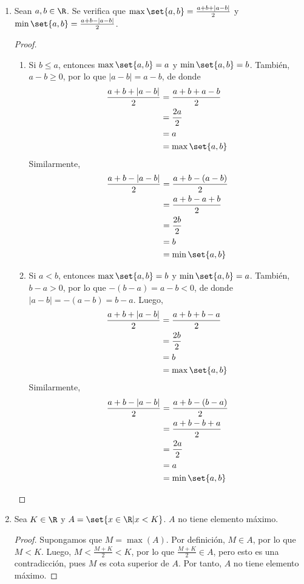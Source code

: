 \begin{enumerate}[label=\alph*)]
  \item Sean $a,b\in \R$. Se verifica que $\max\set{a, b} = \frac{a+b+|a-b|}{2}$ y $\min\set{a, b} = \frac{a+b-|a-b|}{2}$.
  \begin{proof}\leavevmode
    \begin{enumerate}[label=\roman*)]
      \item Si $b\leq a$, entonces $\max\set{a, b}=a$ y $\min\set{a, b}=b$. También, $a-b\geq 0$, por lo que $|a-b|=a-b$, de donde \begin{align*}
        \frac{a+b+|a-b|}{2} &= \frac{a+b+a-b}{2}\\
        &= \frac{2a}{2}\\
        &= a\\
        &= \max\set{a, b}
      \end{align*}
      Similarmente,
      \begin{align*}
        \frac{a+b-|a-b|}{2} &= \frac{a+b-(a-b)}{2}\\
        &= \frac{a+b-a+b}{2}\\
        &= \frac{2b}{2}\\
        &= b\\
        &= \min\set{a, b}
      \end{align*}
      \item Si $a< b$, entonces $\max\set{a, b}=b$ y $\min\set{a, b}=a$. También, $b-a> 0$, por lo que $-(b-a)=a-b< 0$, de donde $|a-b|=-(a-b)=b-a$. Luego,
      \begin{align*}
        \frac{a+b+|a-b|}{2} &= \frac{a+b+b-a}{2}\\
        &= \frac{2b}{2}\\
        &= b\\
        &= \max\set{a, b}
      \end{align*}
      Similarmente,
      \begin{align*}
        \frac{a+b-|a-b|}{2} &= \frac{a+b-(b-a)}{2}\\
        &= \frac{a+b-b+a}{2}\\
        &= \frac{2a}{2}\\
        &= a\\
        &= \min\set{a, b}
      \end{align*}
    \end{enumerate}
  \end{proof}
  
  \item Sea $K\in \R$ y $A=\set{x\in \R|x<K}$. $A$ no tiene elemento máximo.
  \begin{proof}\leavevmode
    Supongamos que $M=\max(A)$. Por definición, $M\in A$, por lo que $M<K$. Luego, $M<\frac{M+K}{2}<K$, por lo que $\frac{M+K}{2}\in A$, pero esto es una contradicción, pues $M$ es cota superior de $A$. Por tanto, $A$ no tiene elemento máximo.
  \end{proof}
  

\end{enumerate}
